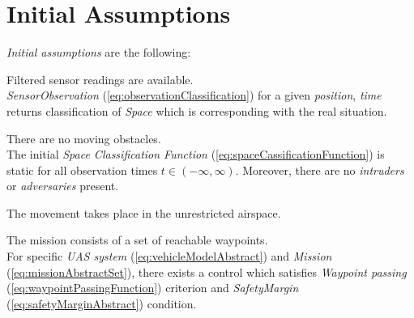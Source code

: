 \newpage
\section{Initial Assumptions} \label{s:initialAssumptions}
    \noindent\emph{Initial assumptions} are the following:

    \begin{assumption}
        {Filtered sensor readings are available}\label{ass:filteredSensors}.\\
        \emph{SensorObservation} (\ref{eq:observationClassification}) for a given \emph{position}, \emph{time} returns classification of \emph{Space} which is corresponding with the real situation.
    \end{assumption}
    
    \begin{assumption}
        {There are no moving obstacles}\label{ass:noMovingObstacles}.\\
        The initial \emph{Space Classification Function} (\ref{eq:spaceCassificationFunction}) is static for all observation times $t \in (-\infty,\infty)$. Moreover, there are no \emph{intruders} or \emph{adversaries} present. 
    \end{assumption}

    \begin{assumption}
        {The movement takes place in the unrestricted airspace.}\label{ass:openAir}
    \end{assumption}

    \begin{assumption}
        {The mission consists of a set of reachable waypoints}\label{ass:reachableWaypoints}.\\
        For specific \emph{UAS system} (\ref{eq:vehicleModelAbstract}) and  \emph{Mission} (\ref{eq:missionAbstractSet}), there exists a control which satisfies \emph{Waypoint passing} (\ref{eq:waypointPassingFunction}) criterion and \emph{SafetyMargin} (\ref{eq:safetyMarginAbstract}) condition.
    \end{assumption}
    
